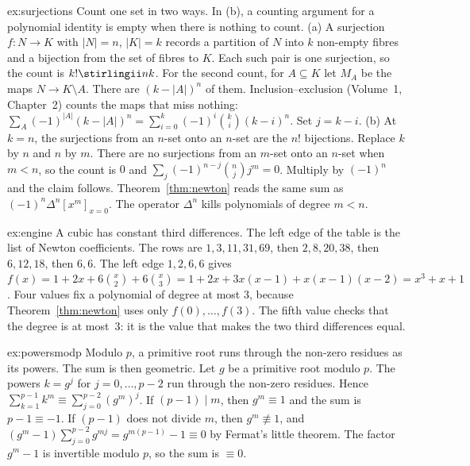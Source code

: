 \begin{solution}{ex:surjections}
\idea Count one set in two ways. In (b), a counting argument for a polynomial identity is empty when there is nothing to count.
\writeup (a) A surjection $f:N\to K$ with $|N|=n$, $|K|=k$ records a partition of $N$ into $k$ non-empty fibres and a bijection from the set of fibres to $K$. Each such pair is one surjection, so the count is $k!\stirlingii nk$. For the second count, for $A\subseteq K$ let $M_A$ be the maps $N\to K\setminus A$. There are $(k-|A|)^n$ of them. Inclusion--exclusion (Volume~1, Chapter~2) counts the maps that miss nothing:
$\sum_{A}(-1)^{|A|}(k-|A|)^n=\sum_{i=0}^k(-1)^i\binom ki(k-i)^n$. Set $j=k-i$.
(b) At $k=n$, the surjections from an $n$-set onto an $n$-set are the $n!$ bijections. Replace $k$ by $n$ and $n$ by $m$. There are no surjections from an $m$-set onto an $n$-set when $m<n$, so the count is $0$ and $\sum_j(-1)^{n-j}\binom njj^m=0$. Multiply by $(-1)^n$ and the claim follows. Theorem~\ref{thm:newton} reads the same sum as $(-1)^n\Delta^n[x^m]_{x=0}$. The operator $\Delta^n$ kills polynomials of degree $m<n$.
\end{solution}

\begin{solution}{ex:engine}
\idea A cubic has constant third differences. The left edge of the table is the list of Newton coefficients.
\writeup The rows are $1,3,11,31,69$, then $2,8,20,38$, then $6,12,18$, then $6,6$. The left edge $1,2,6,6$ gives
$f(x)=1+2x+6\binom x2+6\binom x3=1+2x+3x(x-1)+x(x-1)(x-2)=x^3+x+1$. Four values fix a polynomial of degree at most $3$, because Theorem~\ref{thm:newton} uses only $f(0),\dots,f(3)$. The fifth value checks that the degree is at most~$3$: it is the value that makes the two third differences equal.
\end{solution}

\begin{solution}{ex:powersmodp}
\idea Modulo $p$, a primitive root runs through the non-zero residues as its powers. The sum is then geometric.
\writeup Let $g$ be a primitive root modulo $p$. The powers $k=g^j$ for $j=0,\dots,p-2$ run through the non-zero residues. Hence $\sum_{k=1}^{p-1}k^m\equiv\sum_{j=0}^{p-2}(g^m)^j$. If $(p-1)\mid m$, then $g^m\equiv1$ and the sum is $p-1\equiv-1$. If $(p-1)$ does not divide $m$, then $g^m\not\equiv1$, and $(g^m-1)\sum_{j=0}^{p-2}g^{mj}=g^{m(p-1)}-1\equiv0$ by Fermat's little theorem. The factor $g^m-1$ is invertible modulo $p$, so the sum is $\equiv0$.
\end{solution}


